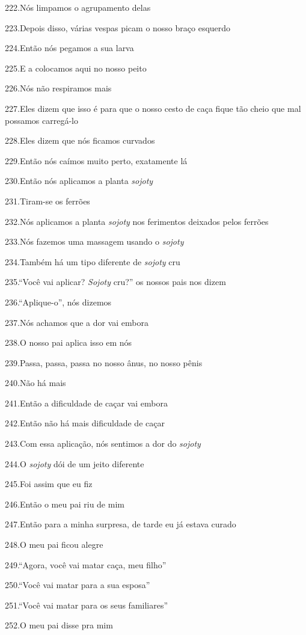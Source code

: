 222.Nós limpamos o agrupamento delas

223.Depois disso, várias vespas picam o nosso braço esquerdo

224.Então nós pegamos a sua larva

225.E a colocamos aqui no nosso peito

226.Nós não respiramos mais

227.Eles dizem que isso é para que o nosso cesto de caça fique tão cheio
que mal possamos carregá-lo

228.Eles dizem que nós ficamos curvados

229.Então nós caímos muito perto, exatamente lá

230.Então nós aplicamos a planta \emph{sojoty}

231.Tiram-se os ferrões

232.Nós aplicamos a planta \emph{sojoty} nos ferimentos deixados pelos
ferrões

233.Nós fazemos uma massagem usando o \emph{sojoty}

234.Também há um tipo diferente de \emph{sojoty} cru

235.``Você vai aplicar? \emph{Sojoty} cru?'' os nossos pais nos dizem

236.``Aplique-o'', nós dizemos

237.Nós achamos que a dor vai embora

238.O nosso pai aplica isso em nós

239.Passa, passa, passa no nosso ânus, no nosso pênis

240.Não há mais

241.Então a dificuldade de caçar vai embora

242.Então não há mais dificuldade de caçar

243.Com essa aplicação, nós sentimos a dor do \emph{sojoty}

244.O \emph{sojoty} dói de um jeito diferente

245.Foi assim que eu fiz

246.Então o meu pai riu de mim

247.Então para a minha surpresa, de tarde eu já estava curado

248.O meu pai ficou alegre

249.``Agora, você vai matar caça, meu filho''

250.``Você vai matar para a sua esposa''

251.``Você vai matar para os seus familiares''

252.O meu pai disse pra mim

